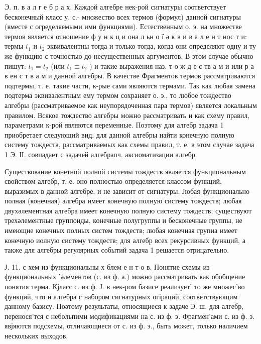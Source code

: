 \documentclass[10pt]{article}
\begin{document}
Э. п. в а л г е б р а х. Каждой алгебре нек-рой сигнатуры соответствует бесконечный класс у. с.- множество всех термов (формул) данной сигнатуры (вместе с огределяемыми ими функциями). Естественным о. э. на множестве термов является отношение ф у н к ц и она л ьн о ї ә к в и в а л е н т нос т и: термы $t_{1}$ и $t_{2}$ эквивалентны тогда и только тогда, когда они определяют одну и ту же функцию с точностыо до несущественных аргументов. В этом случае обычно пишут: $t_{1}=t_{2}$ (или $t_{1} \equiv t_{2}$ ) и такие выражения наз. т о ж д е с тв а м и или р а в ен с т в а м и данной алгебры. В качестве Фрагментов термов рассматриваются подтермы, т. е. такие части, к-рые сами являются термами. Так как любая замена подтерма эквивалентным ему термом сохраняет о. э., то любое тождество алгебры (рассматриваемое как неупорядоченная пара термов) является локальным правилом. Всякое тождество алгебры можно рассматривать и как схему правил, параметрами к-рой являются переменные. Поэтому для алгебр задача 1 приобретает следующий вид: для данной алгебры найти конечную полную систему тождеств, рассматриваемых как схемы правил, т. е. в этом случае задача 1 Э. ІІ. совпадает с задачей алгебрапч. аксиоматизации алгебр.



Существование конетной полной системы тождеств является функциональным свойством алгебр, т. е. оно полностью определяется классом функций, выразимых в данной алгебре, и не зависит от сигнатуры. Јюбая функционально полная (конечная) алгебра имеет конечную полную систему тождеств; любая двухәлементная алгебра имеет конечную полную систему тождеств; существуют трехәлементные группоиды, конечные полугруппы и бесконечные группы, не имеющие конечных полных систем тождеств; любая конечная групиа имеет конечную иолную систему тождеств; для алгебр всех рекурсивных функций, а также для алгебры регулярных событий задача 1 решается отрицательно.



Ј. 11. с хем из функциональны х блем е н т о в. Понятие схемы из функциональных 'әлементов (с. из ф. а.) можно рассматривать как обобщение понятия терма. Кјласс с. из ф. Ј. в нек-ром базисе реализует' то же множес'во функций, что и алгебра с набором сигнатурных огіраций, соответствующим данному базису. Поәтому результаты, относящиеся к задаче Э. ш. для алгебр, перенося'тся с небольпими модификациями на с. из ф. э. Фрагмен'ами с. из ф. э. явјяются подсхемы, отличающиеся от с. из ф. э., быть может, только наличием нескольких выходов.
\end{document}
